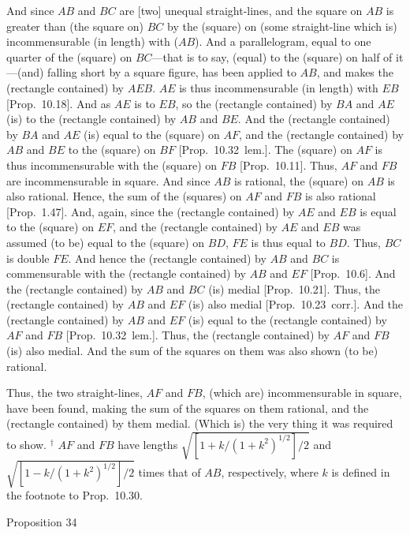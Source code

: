And since $AB$ and $BC$ are [two] unequal straight-lines, and the square
on $AB$ is greater than (the square on) $BC$ by the (square) on (some
straight-line which is) incommensurable (in length) with ($AB$). And a parallelogram,
equal to one quarter of the (square) on $BC$---that is to say, (equal) to the
(square) on half of it---(and) falling short by a square figure, has
been applied to $AB$, and  makes the (rectangle contained) by $AEB$.
$AE$ is thus incommensurable (in length) with $EB$ [Prop.~10.18]. And as $AE$ is to $EB$, so the
(rectangle contained) by $BA$ and $AE$ (is) to the (rectangle contained) by
$AB$ and $BE$.
 And the (rectangle contained) by $BA$ and $AE$ (is) equal to the (square) on $AF$, and the (rectangle contained) by $AB$ and $BE$ to the (square) on
$BF$ [Prop.~10.32~lem.]. The (square) on
$AF$ is thus incommensurable with the (square) on $FB$ [Prop.~10.11]. Thus, $AF$ and $FB$ are
incommensurable in square. And since $AB$ is rational,
the (square) on $AB$ is also rational. Hence, the sum of the
(squares) on $AF$ and $FB$ is also rational [Prop.~1.47]. And, again, since the (rectangle
contained) by $AE$ and $EB$ is equal to the (square) on $EF$, and
the (rectangle contained) by $AE$ and $EB$ 
was assumed (to be) equal to the (square) on $BD$, $FE$ is thus equal to $BD$. Thus, $BC$
is double $FE$. And hence the (rectangle contained) by $AB$ and $BC$ is commensurable with the (rectangle contained) by $AB$ and $EF$ [Prop.~10.6]. And the (rectangle contained) by
$AB$ and $BC$ (is) medial [Prop.~10.21]. 
Thus, the (rectangle contained) by $AB$ and $EF$ (is) also medial
[Prop.~10.23~corr.].  And the (rectangle contained)
by $AB$ and $EF$ (is) equal to the (rectangle contained) by $AF$ and $FB$
[Prop.~10.32~lem.]. Thus, the (rectangle
contained) by $AF$ and $FB$ (is) also medial. And the
sum of the squares on them was also shown (to be) rational.

Thus, the two straight-lines, $AF$ and $FB$, (which are)
incommensurable in  square, have been found, making the
sum of the squares on them rational, and the (rectangle contained)
by them medial. (Which is) the very thing it was required to show.
{\footnotesize\noindent$^\dag$ $AF$ and $FB$ have lengths
$\sqrt{[1+k/(1+k^2)^{1/2}]/2}$ and $\sqrt{[1-k/(1+k^2)^{1/2}]/2}$
times that of $AB$, respectively, where $k$ is defined in the footnote
to Prop.~10.30.}


\begin{center}
{\large Proposition 34}
\end{center}

